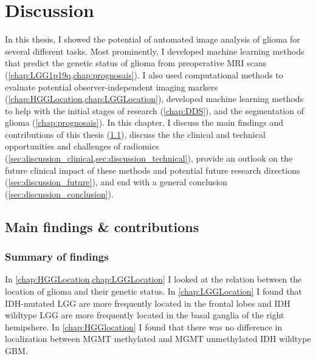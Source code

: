 
\chapter{Discussion}\label{chap:discussion}
\begin{ChapterAbstractNoTitle}
\end{ChapterAbstractNoTitle}
In this thesis, I showed the potential of automated image analysis of glioma for several different tasks.
Most prominently, I developed machine learning methods that predict the genetic status of glioma from preoperative \gls{MRI} scans (\cref{chap:LGG1p19q,chap:prognosais}).
I also used computational methods to evaluate potential observer-independent imaging markers (\cref{chap:HGGLocation,chap:LGGLocation}), developed machine learning methods to help with the initial stages of research (\cref{chap:DDS}), and the segmentation of glioma (\cref{chap:prognosais}).
In this chapter, I discuss the main findings and contributions of this thesis (\cref{sec:discussion_main_findings}), discuss the the clinical and technical opportunities and challenges of radiomics (\cref{sec:discussion_clinical,sec:discussion_technical}), provide an outlook on the future clinical impact of these methods and potential future research directions (\cref{sec:discussion_future}), and end with a general conclusion (\cref{sec:discussion_conclusion}).

\section{Main findings \& contributions}\label{sec:discussion_main_findings}

\subsection{Summary of findings}

In \cref{chap:HGGLocation,chap:LGGLocation} I looked at the relation between the location of \gls{glioma} and their genetic status.
In \cref{chap:LGGLocation} I found that \gls{IDH}-mutated \gls{LGG} are more frequently located in the frontal lobes and \gls{IDH} wildtype \gls{LGG} are more frequently located in the basal ganglia of the right hemipshere.
In \cref{chap:HGGlocation} I found that there was no difference in localization between \gls{MGMT} methylated and \gls{MGMT} unmethylated \gls{IDH} wildtype \gls{GBM}.


